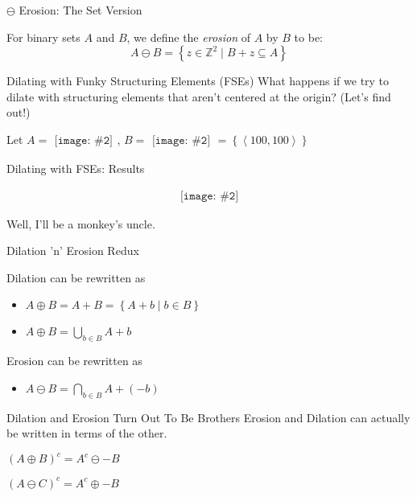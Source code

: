\documentclass{beamer}
\newcommand{\pic}[2]{
     \begin{array}{l}
      \texttt{[image: \#2]}
      \end{array}
}
\newcommand{\set}[1]{\left\lbrace #1 \right\rbrace}
\newcommand{\buildset}[2]{\set{#1 \mid #2}}
\newcommand{\tuple}[1]{\left\langle #1 \right\rangle}
\newcommand{\bigintersect}[1]{\displaystyle\bigcap_{#1}}
\newcommand{\bigunion}[1]{\displaystyle\bigcup_{#1}}
\newcommand{\dilate}{\oplus}
\newcommand{\erode}{\ominus}
\begin{document}
\begin{frame}{$\erode$ Erosion: The Set Version}
   \begin{definition}
    For binary sets $A$ and $B$, we define the \emph{erosion} of 
    $A$ by $B$ to be:
    $$A \erode B=\buildset{z \in \mathbb{Z}^2}{B+z \subseteq A}$$
  \end{definition}
 
\end{frame}
\begin{frame}{Dilating with Funky Structuring Elements (FSEs)}
  What happens if we try to dilate with structuring elements that aren't
  centered at the origin? (Let's find out!)

  Let $A = \pic{width=50pt}{images/binarycoolhamblen.png}$,
      $B = \pic{width=50pt}{images/fse.png}=
           \set{\tuple{100,100}}$

\end{frame}

\begin{frame}{Dilating with FSEs: Results}

$$\pic{width=50pt}{./images/coolhamblen_translated.png}$$

Well, I'll be a monkey's uncle.

\end{frame}

\begin{frame}{Dilation 'n' Erosion Redux}

  Dilation can be rewritten as
  \begin{itemize}
    \item $A \dilate B = A + B = \buildset{A + b}{b \in B}$
    \item $A \dilate B = \bigunion{b \in B}A + b$
  \end{itemize}

  Erosion can be rewritten as
  \begin{itemize}
    \item $A \erode B = \bigintersect{b \in B}A + (-b)$
  \end{itemize}
  
\end{frame}

\begin{frame}{Dilation and Erosion Turn Out To Be Brothers}
  Erosion and Dilation can actually be written in terms of the other.

  $(A \dilate B)^c = A^c \erode -B$

  $(A \erode C)^c = A^c \dilate -B$
\end{frame}
\end{document}
